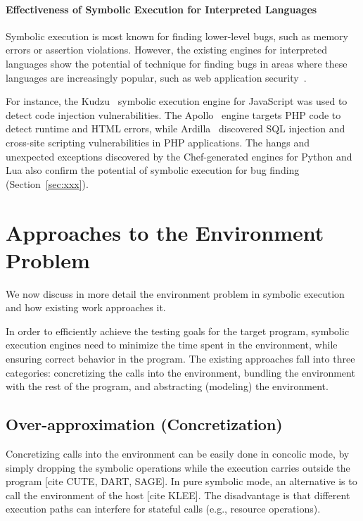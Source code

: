 \paragraph{Effectiveness of Symbolic Execution for Interpreted Languages}

Symbolic execution is most known for finding lower-level bugs, such as memory errors or assertion violations.  However, the existing engines for interpreted languages show the potential of technique for finding bugs in areas where these languages are increasingly popular, such as web application security~\cite{saxena-kudzu,artzi-apollo, kiezun-ardilla}.

For instance, the Kudzu~\cite{saxena-kudzu} symbolic execution engine for JavaScript was used to detect code injection vulnerabilities.  The Apollo~\cite{artzi-apollo} engine targets PHP code to detect runtime and HTML errors, while Ardilla~\cite{kiezun-ardilla} discovered SQL injection and cross-site scripting vulnerabilities in PHP applications.
%
The hangs and unexpected exceptions discovered by the Chef-generated engines for Python and Lua also confirm the potential of symbolic execution for bug finding (Section~\ref{sec:xxx}).



\section{Approaches to the Environment Problem}
\label{sec:relwork:envproblem}

We now discuss in more detail the environment problem in symbolic execution and how existing work approaches it.

In order to efficiently achieve the testing goals for the target program, symbolic execution engines need to minimize the time spent in the environment, while ensuring correct behavior in the program.
%
The existing approaches fall into three categories: concretizing the calls into the environment, bundling the environment with the rest of the program, and abstracting (modeling) the environment.

\subsection{Over-approximation (Concretization)}

Concretizing calls into the environment can be easily done in concolic mode, by simply dropping the symbolic operations while the execution carries outside the program [cite CUTE, DART, SAGE].  In pure symbolic mode, an alternative is to call the environment of the host [cite KLEE].  The disadvantage is that different execution paths can interfere for stateful calls (e.g., resource operations).

